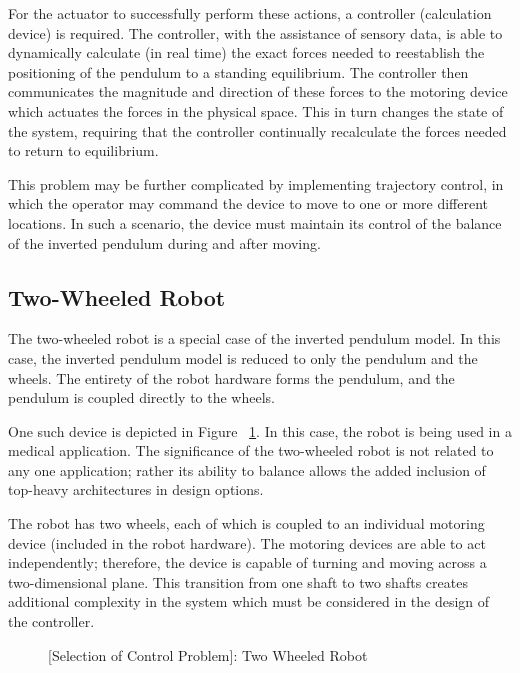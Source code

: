 \documentclass[crop=false,float=true,class=scrreprt]{standalone}
\begin{document}
For the actuator to successfully perform these actions, a controller {\fns(calculation device)} is required.
The controller, with the assistance of sensory data, is able to dynamically calculate {\fns(in real time)} 
the exact forces needed to reestablish the positioning of the pendulum to a standing equilibrium.
The controller then communicates the magnitude and direction of these forces to the motoring device 
which actuates the forces in the physical space.
This in turn changes the state of the system, 
requiring that the controller continually recalculate the forces needed to return to equilibrium.

This problem may be further complicated by implementing trajectory control,
in which the operator may command the device to move to one or more different locations.
In such a scenario, the device must maintain its control of the balance of the inverted pendulum
during and after moving.




\subsection{Two-Wheeled Robot}
\label{SEC:preliminaryDecisions:selectionControlProblem:twoWheeledRobot}

The two-wheeled robot is a special case of the inverted pendulum model.
In this case, the inverted pendulum model is reduced to only the pendulum and the wheels.
The entirety of the robot hardware forms the pendulum, and
the pendulum is coupled directly to the wheels.

One such device is depicted in Figure~%
\ref{FIG:preliminaryDecisions:selectionControlProblem:twoWheeledRobot}.
In this case, the robot is being used in a medical application.
The significance of the two-wheeled robot is not related to any one application; rather
its ability to balance allows the added inclusion of top-heavy architectures in design options.

The robot has two wheels, 
each of which is coupled to an individual motoring device {\fns(included in the robot hardware)}.
The motoring devices are able to act independently; therefore,
the device is capable of turning and moving across a two-dimensional plane.
This transition from one shaft to two shafts creates additional complexity in the system
which must be considered in the design of the controller.




\clearpage




\vspace*{\fill}
\begin{figure}[H]
\centering%
%
\caption[{[Selection of Control Problem]: Two Wheeled Robot}]%
        {{[Selection of Control Problem]: Two Wheeled Robot~%
          \cite{REF:online:twoWheeledRobot:examplePhoto}%
          \label{FIG:preliminaryDecisions:selectionControlProblem:twoWheeledRobot}%
        }}
\end{figure}
\vspace*{\fill}




\clearpage
\end{document}
